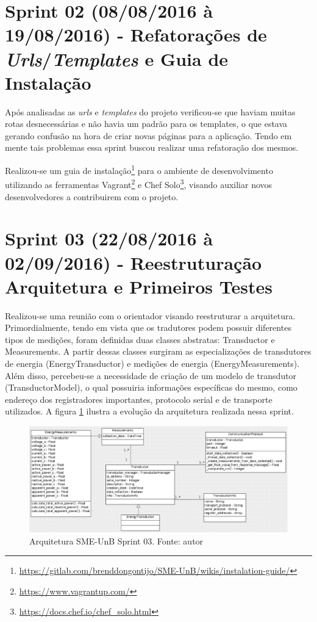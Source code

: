 \vfill
\pagebreak

\section{Sprint 02 (08/08/2016 à 19/08/2016) - Refatorações de \textit{Urls}/\textit{Templates} e Guia de Instalação}
Após analisadas as \textit{urls} e \textit{templates} do projeto verificou-se que haviam muitas rotas desnecessárias e não havia um padrão para os templates, o que estava gerando confusão na hora de criar novas páginas para a aplicação. Tendo em mente tais problemas essa sprint buscou realizar uma refatoração dos mesmos.

Realizou-se um guia de instalação\footnote{\url{https://gitlab.com/brenddongontijo/SME-UnB/wikis/instalation-guide/}} para o ambiente de desenvolvimento utilizando as ferramentas Vagrant\footnote{\url{https://www.vagrantup.com/}} e Chef Solo\footnote{\url{https://docs.chef.io/chef_solo.html}}, visando auxiliar novos desenvolvedores a contribuirem com o projeto.

\section{Sprint 03 (22/08/2016 à 02/09/2016) - Reestruturação Arquitetura e Primeiros Testes}
Realizou-se uma reunião com o orientador visando reestruturar a arquitetura. Primordialmente, tendo em vista que os tradutores podem possuir diferentes tipos de medições, foram definidas duas classes abstratas: Transductor e Measurements. A partir dessas classes surgiram as especializações de transdutores de energia (EnergyTransductor) e medições de energia (EnergyMeasurements). Além disso, percebeu-se a necessidade de criação de um modelo de transdutor (TransductorModel), o qual possuiria informações específicas do mesmo, como endereço dos registradores importantes, protocolo serial e de transporte utilizados. A figura \ref{sprint03arq} ilustra a evolução da arquitetura realizada nessa sprint.

\begin{figure}[!htpb]
    \centering
    \includegraphics[scale=0.6,angle=90]{figuras/sprint03arq.eps}
    \caption{Arquitetura SME-UnB Sprint 03. Fonte: autor}
    \label{sprint03arq}
\end{figure}

